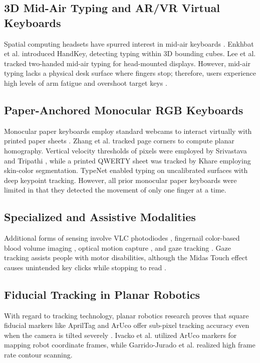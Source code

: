 \subsection{3D Mid-Air Typing and AR/VR Virtual Keyboards}
\label{subsec:lit_air_systems}
Spatial computing headsets have spurred interest in mid-air keyboards \cite{Boletsis2019TextInput, Enkhbat2020HandKey, Lee2022Virtual, Yoo2026WordLevel}. Enkhbat et al. \cite{Enkhbat2020HandKey} introduced HandKey, detecting typing within 3D bounding cubes. Lee et al. \cite{Lee2022Virtual} tracked two-handed mid-air typing for head-mounted displays. However, mid-air typing lacks a physical desk surface where fingers stop; therefore, users experience high levels of arm fatigue and overshoot target keys \cite{Boletsis2019TextInput, Maman2023TypeNet}.

\subsection{Paper-Anchored Monocular RGB Keyboards}
\label{subsec:lit_paper_systems}
Monocular paper keyboards employ standard webcams to interact virtually with printed paper sheets \cite{Zhang2001Visual, Srivastava2012RealTime, Khare2019QWERTY, Maman2023TypeNet}. Zhang et al. \cite{Zhang2001Visual} tracked page corners to compute planar homography. Vertical velocity thresholds of pixels were employed by Srivastava and Tripathi \cite{Srivastava2012RealTime}, while a printed QWERTY sheet was tracked by Khare \cite{Khare2019QWERTY} employing skin-color segmentation. TypeNet \cite{Maman2023TypeNet} enabled typing on uncalibrated surfaces with deep keypoint tracking. However, all prior monocular paper keyboards were limited in that they detected the movement of only one finger at a time.

\subsection{Specialized and Assistive Modalities}
\label{subsec:lit_specialized_assistive}
Additional forms of sensing involve VLC photodiodes \cite{Webber2021Finger}, fingernail color-based blood volume imaging \cite{Sun2009Estimation}, optical motion capture \cite{MacRitchie2015Integrating, Pilkov2024Markerless}, and gaze tracking \cite{Chen2024Gaze}. Gaze tracking assists people with motor disabilities, although the Midas Touch effect causes unintended key clicks while stopping to read \cite{Chen2024Gaze}.

\subsection{Fiducial Tracking in Planar Robotics}
\label{subsec:lit_robotics_systems}
With regard to tracking technology, planar robotics research proves that square fiducial markers like AprilTag and ArUco offer sub-pixel tracking accuracy even when the camera is tilted severely \cite{Ivacko2024Edge, Herdiansyah2024Implementation, Schenck2024Utilizing, GarridoJurado2026ArUco}. Ivacko et al. \cite{Ivacko2024Edge} utilized ArUco markers for mapping robot coordinate frames, while Garrido-Jurado et al. \cite{GarridoJurado2026ArUco} realized high frame rate contour scanning.

